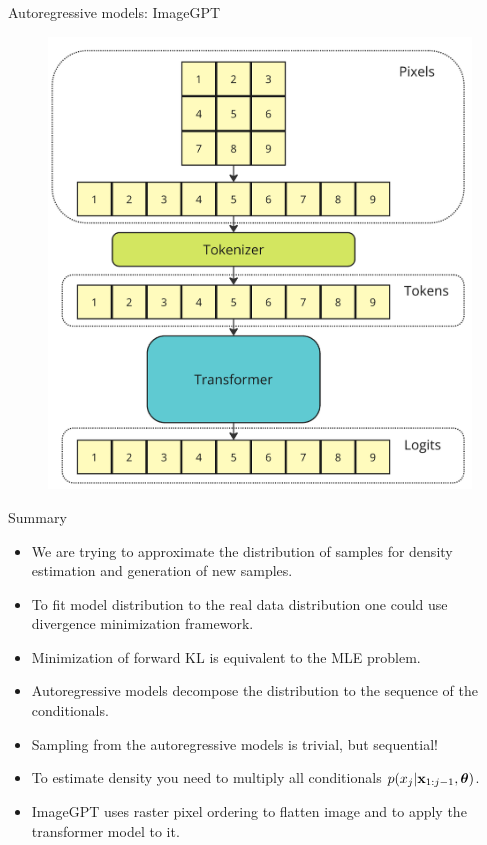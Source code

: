 \begin{frame}{Autoregressive models: ImageGPT}
	\begin{figure}
		\centering
  			\includegraphics[width=0.65\linewidth]{figs/imagegpt.png}
	\end{figure}
\end{frame}
\begin{frame}{Summary}
    \begin{itemize}
    	\item We are trying to approximate the distribution of samples for density estimation and generation of new samples.
    	\vfill
    	\item To fit model distribution to the real data distribution one could use divergence minimization framework.
    	\vfill
    	\item Minimization of forward KL is equivalent to the MLE problem.
    	\vfill
    	\item Autoregressive models decompose the distribution to the sequence of the conditionals.
    	 \vfill
        \item Sampling from the autoregressive models is trivial, but sequential!
        \vfill
        \item To estimate density you need to multiply all conditionals $p(x_j | \mathbf{x}_{1:j - 1}, \boldsymbol{\theta})$.
        \vfill
     	\item ImageGPT uses raster pixel ordering to flatten image and to apply the transformer model to it.
    \end{itemize}
\end{frame}

 